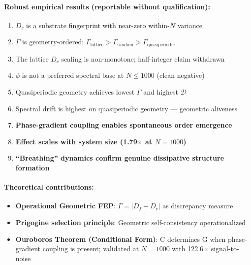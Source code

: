 \documentclass[12pt,a4paper]{article}
\theoremstyle{plain}
\theoremstyle{definition}
\begin{document}
\paragraph{Robust empirical results (reportable without qualification):}
\begin{enumerate}
  \item $D_c$ is a substrate fingerprint with near-zero within-$N$ variance
  \item $\Gamma$ is geometry-ordered: $\Gamma_{\text{lattice}} > \Gamma_{\text{random}} > \Gamma_{\text{quasiperiodic}}$
  \item The lattice $D_c$ scaling is non-monotone; half-integer claim withdrawn
  \item $\phi$ is not a preferred spectral base at $N \leq 1000$ (clean negative)
  \item Quasiperiodic geometry achieves lowest $\Gamma$ and highest $\mathcal{D}$
  \item Spectral drift is highest on quasiperiodic geometry --- geometric aliveness
  \item \textbf{Phase-gradient coupling enables spontaneous order emergence}
  \item \textbf{Effect scales with system size (1.79$\times$ at $N=1000$)}
  \item \textbf{``Breathing'' dynamics confirm genuine dissipative structure formation}
\end{enumerate}

\paragraph{Theoretical contributions:}
\begin{itemize}
  \item \textbf{Operational Geometric FEP}: $\Gamma = |D_f - D_c|$ as discrepancy measure
  \item \textbf{Prigogine selection principle}: Geometric self-consistency operationalized
  \item \textbf{Ouroboros Theorem (Conditional Form)}: C determines G when phase-gradient
coupling is present; validated at $N=1000$ with 122.6$\times$ signal-to-noise
\end{itemize}

\begin{center}
\end{center}
\end{document}
